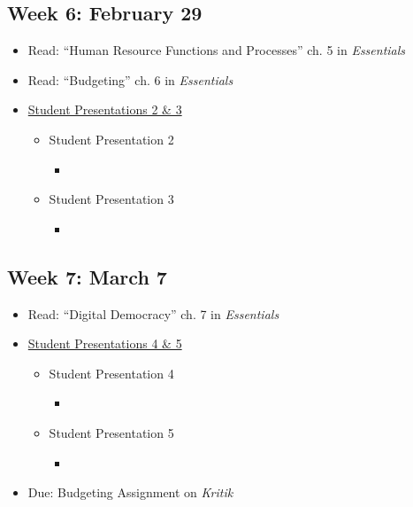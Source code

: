 \documentclass[10pt, letterpaper]{article}
\begin{document}
    \subsection*{Week 6: February 29} 
    \begin{itemize}
        \item Read: ``Human Resource Functions and Processes'' ch. 5 in \emph{Essentials} 
        \item Read: ``Budgeting'' ch. 6 in \emph{Essentials}
        \item \underline{Student Presentations 2 \& 3}
        \begin{itemize}
            \item Student Presentation 2
            \begin{itemize}
                \item \cite{PERLMAN2016}
            \end{itemize}
            \item Student Presentation 3
            \begin{itemize}
                \item \cite{AFONSO2021}
            \end{itemize}
        \end{itemize}
    \end{itemize}

    \subsection*{Week 7: March 7} 
    \begin{itemize}
        \item Read: ``Digital Democracy'' ch. 7 in \emph{Essentials}
        \item \underline{Student Presentations 4 \& 5}
        \begin{itemize}
            \item Student Presentation 4
            \begin{itemize}
                \item \cite{YOUNG2020a}
            \end{itemize}
            \item Student Presentation 5
            \begin{itemize}
                \item \cite{KIM2021}
            \end{itemize}
        \end{itemize}	
        \item Due: Budgeting Assignment on \emph{Kritik}
    \end{itemize}
\end{document}
